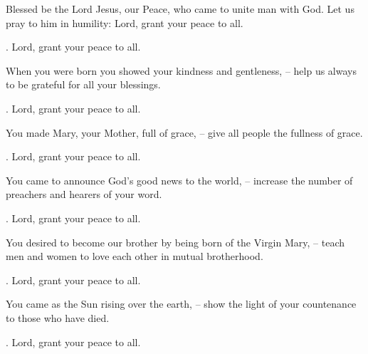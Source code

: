 \lettrine[loversize=0.15,lines=2]{B}{}lessed be the Lord Jesus, our Peace, who came to unite man with God. Let us pray to him in humility: Lord, grant your peace to all.
\par \Rbar. Lord, grant your peace to all.

When you were born you showed your kindness and gentleness,
– help us always to be grateful for all your blessings.
\par \Rbar. Lord, grant your peace to all.

You made Mary, your Mother, full of grace,
– give all people the fullness of grace.
\par \Rbar. Lord, grant your peace to all.

You came to announce God’s good news to the world,
– increase the number of preachers and hearers of your word.
\par \Rbar. Lord, grant your peace to all.

You desired to become our brother by being born of the Virgin Mary,
– teach men and women to love each other in mutual brotherhood.
\par \Rbar. Lord, grant your peace to all.

You came as the Sun rising over the earth,
– show the light of your countenance to those who have died.
\par \Rbar. Lord, grant your peace to all.